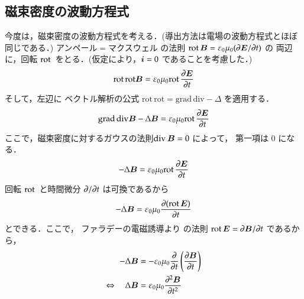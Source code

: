     \subsection{磁束密度の波動方程式}
            今度は，磁束密度の波動方程式を考える．(導出方法は電場の波動方程式とほぼ同じである．)
            アンペール$=$マクスウェル
            の法則 $\mathrm{rot}\,\boldsymbol{B}=\varepsilon_{0}\mu_{0}(\partial \boldsymbol{E}/\partial t)$ の
            両辺に，回転 $\mathrm{rot}\,$ をとる．(仮定により，$\boldsymbol{i}=0$ であることを考慮した．)
                \begin{align}
                    \mathrm{rot\,rot}\boldsymbol{B}
                    =\varepsilon_{0}\mu_{0}\mathrm{rot}\,
                    \frac{\partial \boldsymbol{E}}{\partial t}
                \end{align}
            そして，左辺に ベクトル解析の公式 $\mathrm{rot\, rot}=\mathrm{grad\, div}-\Delta$ を適用する．
                \begin{align}
                    \mathrm{grad\, div}\boldsymbol{B}- \Delta \boldsymbol{B}
                    =\varepsilon_{0}\mu_{0}\mathrm{rot}\,
                    \frac{\partial \boldsymbol{E}}{\partial t}
                \end{align}
            ここで，磁束密度に対するガウスの法則$\mathrm{div}\,\boldsymbol{B}=0$ によって，
            第一項は 0 になる．
                \begin{align}
                    -\Delta \boldsymbol{B}
                    =\varepsilon_{0}\mu_{0}\mathrm{rot}\,
                    \frac{\partial \boldsymbol{E}}{\partial t}
                \end{align}
            回転 $\mathrm{rot}\,$ と時間微分 $\partial /\partial t$ は可換であるから
                \begin{align}
                    -\Delta \boldsymbol{B}
                    =\varepsilon_{0}\mu_{0}
                    \frac{\partial (\mathrm{rot}\,\boldsymbol{E})}{\partial t}
                \end{align}
            とできる．ここで，
            ファラデーの電磁誘導より
            の法則 $\mathrm{rot}\, \boldsymbol{E}
            =\partial \boldsymbol{B}/\partial t$ であるから，
                \begin{align}
                    -\Delta \boldsymbol{B}
                    &=-\varepsilon_{0}\mu_{0}
                    \frac{\partial }{\partial t}\left(\frac{\partial \boldsymbol{B}}{\partial t}\right) \notag \\
                    \Leftrightarrow\quad
                    \Delta \boldsymbol{B}
                    &=\varepsilon_{0}\mu_{0}
                    \frac{\partial^{2} \boldsymbol{B}}{\partial t^{2}}
                \end{align}
